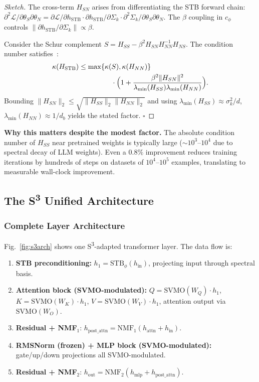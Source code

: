 \documentclass{scpe}
\newcommand{\sthree}{S\textsuperscript{3}}
\begin{document}
\begin{proof}[Sketch]
The cross-term $H_{SN}$ arises from differentiating the STB forward chain:
$\partial^2\mathcal{L}/\partial\theta_S\partial\theta_N = 
\partial\mathcal{L}/\partial h_{\text{STB}} \cdot \partial h_{\text{STB}}/\partial\Sigma_k \cdot \partial^2\Sigma_k/\partial\theta_S\partial\theta_N$.
The $\beta$ coupling in $c_\phi$ controls $\|\partial h_{\text{STB}}/\partial\Sigma_k\| \propto \beta$.

Consider the Schur complement $S = H_{SS} - \beta^2 H_{SN} H_{NN}^{-1} H_{NS}$. The condition number satisfies~\cite{nesterov2004introductory}:
\begin{align}
\kappa(H_{\text{STB}}) \leq \max\{\kappa(&S), \kappa(H_{NN})\} \nonumber\\
&\cdot \Bigl(1 + \frac{\beta^2 \|H_{SN}\|^2}{\lambda_{\min}(H_{SS})\lambda_{\min}(H_{NN})}\Bigr).
\end{align}
Bounding $\|H_{SN}\|_2 \leq \sqrt{\|H_{SS}\|_2 \|H_{NN}\|_2}$ and using $\lambda_{\min}(H_{SS}) \approx \sigma_k^2/d$, $\lambda_{\min}(H_{NN}) \approx 1/d_b$ yields the stated factor. $\square$
\end{proof}

\textbf{Why this matters despite the modest factor.} The absolute condition number of $H_{SS}$ near pretrained weights is typically large ($\sim 10^3$--$10^4$ due to spectral decay of LLM weights). Even a $0.8\%$ improvement reduces training iterations by hundreds of steps on datasets of $10^4$--$10^5$ examples, translating to measurable wall-clock improvement.

\subsection{The \sthree{} Unified Architecture}

\subsubsection{Complete Layer Architecture}

Fig.~\ref{fig:s3arch} shows one S\textsuperscript{3}-adapted transformer layer. The data flow is:

\begin{enumerate}[leftmargin=*,nosep]
    \item \textbf{STB preconditioning:} $h_1 = \text{STB}_\phi(h_{\text{in}})$, projecting input through spectral basis.
    \item \textbf{Attention block (SVMO-modulated):} $Q = \text{SVMO}(W_Q) \cdot h_1$, $K = \text{SVMO}(W_K) \cdot h_1$, $V = \text{SVMO}(W_V) \cdot h_1$, attention output via $\text{SVMO}(W_O)$.
    \item \textbf{Residual + NMF}$_1$: $h_{\text{post\_attn}} = \text{NMF}_1(h_{\text{attn}} + h_{\text{in}})$.
    \item \textbf{RMSNorm (frozen) + MLP block (SVMO-modulated):} gate/up/down projections all SVMO-modulated.
    \item \textbf{Residual + NMF}$_2$: $h_{\text{out}} = \text{NMF}_2(h_{\text{mlp}} + h_{\text{post\_attn}})$.
\end{enumerate}
\end{document}
